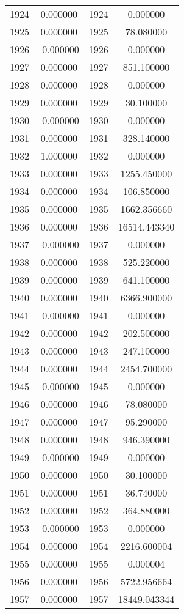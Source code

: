 \documentclass[12pt]{article}
\begin{document}
\begin{longtable}{@{}cccc@{}}
1924 & 0.000000 & 1924 & 0.000000 \\
1925 & 0.000000 & 1925 & 78.080000 \\
1926 & -0.000000 & 1926 & 0.000000 \\
1927 & 0.000000 & 1927 & 851.100000 \\
1928 & 0.000000 & 1928 & 0.000000 \\
1929 & 0.000000 & 1929 & 30.100000 \\
1930 & -0.000000 & 1930 & 0.000000 \\
1931 & 0.000000 & 1931 & 328.140000 \\
1932 & 1.000000 & 1932 & 0.000000 \\
1933 & 0.000000 & 1933 & 1255.450000 \\
1934 & 0.000000 & 1934 & 106.850000 \\
1935 & 0.000000 & 1935 & 1662.356660 \\
1936 & 0.000000 & 1936 & 16514.443340 \\
1937 & -0.000000 & 1937 & 0.000000 \\
1938 & 0.000000 & 1938 & 525.220000 \\
1939 & 0.000000 & 1939 & 641.100000 \\
1940 & 0.000000 & 1940 & 6366.900000 \\
1941 & -0.000000 & 1941 & 0.000000 \\
1942 & 0.000000 & 1942 & 202.500000 \\
1943 & 0.000000 & 1943 & 247.100000 \\
1944 & 0.000000 & 1944 & 2454.700000 \\
1945 & -0.000000 & 1945 & 0.000000 \\
1946 & 0.000000 & 1946 & 78.080000 \\
1947 & 0.000000 & 1947 & 95.290000 \\
1948 & 0.000000 & 1948 & 946.390000 \\
1949 & -0.000000 & 1949 & 0.000000 \\
1950 & 0.000000 & 1950 & 30.100000 \\
1951 & 0.000000 & 1951 & 36.740000 \\
1952 & 0.000000 & 1952 & 364.880000 \\
1953 & -0.000000 & 1953 & 0.000000 \\
1954 & 0.000000 & 1954 & 2216.600004 \\
1955 & 0.000000 & 1955 & 0.000004 \\
1956 & 0.000000 & 1956 & 5722.956664 \\
1957 & 0.000000 & 1957 & 18449.043344 \\

\end{longtable}
\end{document}
